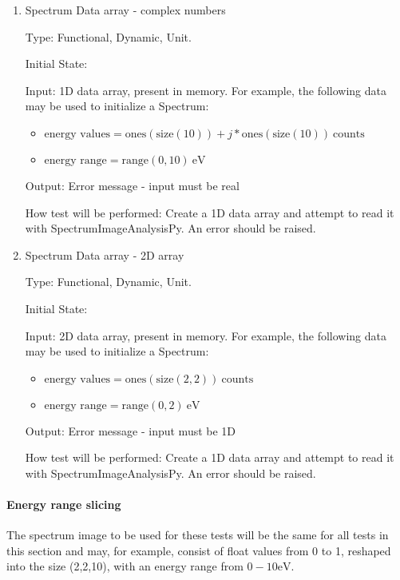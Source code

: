 \documentclass[12pt, titlepage]{article}
\newcommand{\progname}{SpectrumImageAnalysisPy}
\begin{document}
\begin{enumerate}
\item{Spectrum Data array - complex numbers}

Type: Functional, Dynamic, Unit.

Initial State: 

Input: 1D data array, present in memory. For example, the following data may be used to initialize a Spectrum:
\begin{itemize}
	\item $\text{energy values} = \text{ones}(\text{size}(10)) + j*\text{ones}(\text{size}(10))\ \text{counts}$
	\item $\text{energy range} = \text{range}(0, 10)\ \si{\electronvolt}$
\end{itemize}

Output: Error message - input must be real

How test will be performed: Create a 1D data array and attempt to read it with \progname{}. An error should be raised.


\item{Spectrum Data array - 2D array}

Type: Functional, Dynamic, Unit.

Initial State: 

Input: 2D data array, present in memory. For example, the following data may be used to initialize a Spectrum:
\begin{itemize}
	\item $\text{energy values} = \text{ones}(\text{size}(2, 2))\ \text{counts}$
	\item $\text{energy range} = \text{range}(0, 2)\ \si{\electronvolt}$
\end{itemize}

Output: Error message - input must be 1D

How test will be performed: Create a 1D data array and attempt to read it with \progname{}. An error should be raised.

\end{enumerate}

\paragraph{Energy range slicing}

The spectrum image to be used for these tests will be the same for all tests in this section and may, for example, consist of float values from 0 to 1, reshaped into the size (2,2,10), with an energy range from $0-10 \si{\electronvolt}$.
\end{document}
